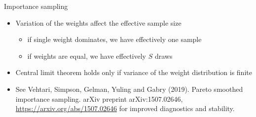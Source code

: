 \documentclass[finnish,english,t]{beamer}
\begin{document}
\begin{frame}
  
  {\Large\color{navyblue} Importance sampling}

  \begin{itemize}
  \item Variation of the weights affect the effective sample size
    \begin{itemize}
    \item if single weight dominates, we have effectively one sample
    \item if weights are equal, we have effectively $S$ draws
    \end{itemize}
  \item Central limit theorem holds only if variance of the weight
    distribution is finite
  \item See Vehtari, Simpson, Gelman, Yuling and Gabry (2019). Pareto
    smoothed importance sampling. arXiv preprint arXiv:1507.02646,
    \url{https://arxiv.org/abs/1507.02646} for improved diagnostics
    and stability.
  \end{itemize}

\end{frame}
\end{document}
